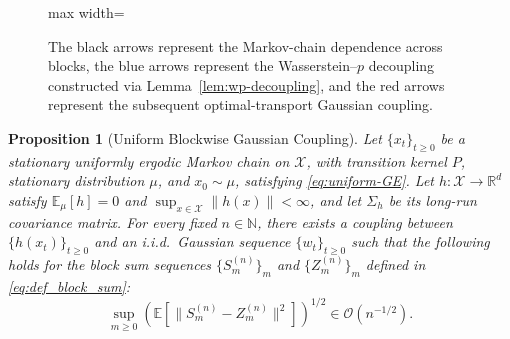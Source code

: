 \documentclass[11pt,letterpaper]{article}
\theoremstyle{plain}
\newtheorem{proposition}{Proposition}
\theoremstyle{definition}
\theoremstyle{remark}
\newcommand{\E}{\mathbb{E}}
\begin{document}
\begin{figure}[htbp!]
\centering
\begin{adjustbox}{max width=\linewidth}
\end{adjustbox}
\caption{The black arrows represent the Markov-chain dependence across blocks, the blue
arrows represent the Wasserstein--\(p\) decoupling constructed via
Lemma~\ref{lem:wp-decoupling}, and the red arrows represent the subsequent
optimal-transport Gaussian coupling.
}
\label{fig:decoupling}
\end{figure}
\begin{proposition}[Uniform Blockwise Gaussian Coupling]
\label{prop:uniform}
Let \(\{x_t\}_{t\geq0}\) be a stationary uniformly ergodic Markov chain on
\(\mathcal X\), with transition kernel \(P\), stationary distribution
\(\mu\), and \(x_0\sim\mu\), satisfying \eqref{eq:uniform-GE}.
Let \(h:\mathcal X\to\mathbb R^d\) satisfy \(\E_\mu[h]=0\) and
\(\sup_{x\in\mathcal X}\|h(x)\|<\infty\), and let \(\Sigma_h\) be its
long-run covariance matrix. For every fixed \(n\in\mathbb N\), there exists a coupling between
\(\{h(x_t)\}_{t\geq0}\) and an i.i.d.\ Gaussian sequence
\(\{w_t\}_{t\geq0}\) such that the following holds for the block sum sequences $\{S^{(n)}_m\}_m$ and $\{Z^{(n)}_m\}_m$ defined in \eqref{eq:def_block_sum}:
\begin{equation}
\label{eq:uniform-block-W2}
    \sup_{m\geq0}
    \left(
        \E\!\left[
            \bigl\|S_m^{(n)}-Z_m^{(n)}\bigr\|^2
        \right]
    \right)^{1/2}
    \in \mathcal{O}(n^{-1/2}).
\end{equation}
\end{proposition}
\end{document}
